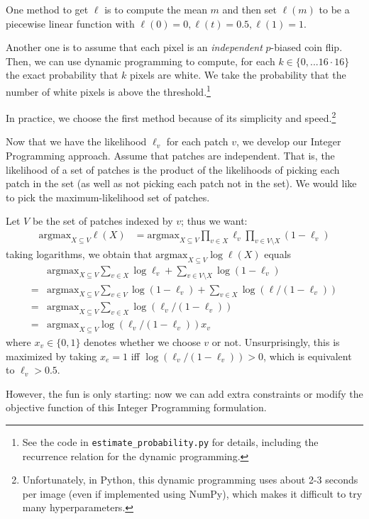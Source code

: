 \documentclass[10pt,conference,compsocconf]{IEEEtran}
\newcommand{\argmax}{\mathrm{argmax}}
\begin{document}
One method to get $\ell$ is to compute the mean $m$ and then set $\ell(m)$ to be a piecewise linear function with $\ell(0) = 0, \ell(t) = 0.5, \ell(1) = 1$.

Another one is to assume that each pixel is an \emph{independent} $p$-biased coin flip. Then, we can use dynamic programming to compute, for each $k \in \{0, ... 16 \cdot 16\}$ the exact probability that $k$ pixels are white. We take the probability that the number of white pixels is above the threshold.\footnote{See the code in \texttt{estimate\_probability.py} for details, including the recurrence relation for the dynamic programming.}

In practice, we choose the first method because of its simplicity and speed.\footnote{Unfortunately, in Python, this dynamic programming uses about 2-3 seconds per image (even if implemented using NumPy), which makes it difficult to try many hyperparameters.}

Now that we have the likelihood $\ell_v$ for each patch $v$, we develop our Integer Programming approach. Assume that patches are independent. That is, the likelihood of a set of patches is the product of the likelihoods of picking each patch in the set (as well as not picking each patch not in the set). We would like to pick the maximum-likelihood set of patches.


Let $V$ be the set of patches indexed by $v$; thus we want:
\begin{align*}
\argmax_{X \subseteq V} \ell(X) &= \argmax_{X \subseteq V} \prod_{v \in X} \ell_v \prod_{v \in V \setminus X} (1 - \ell_v)
\end{align*}
taking logarithms, we obtain that $\argmax_{X \subseteq V} \log \ell(X) $ equals
\begin{align*}
& \argmax_{X \subseteq V} \sum_{v \in X} \log \ell_v + \sum_{v \in V \setminus X} \log (1 - \ell_v) \\
=& \argmax_{X \subseteq V} \sum_{v \in V} \log (1 - \ell_v) + \sum_{v \in X} \log (\ell / (1 - \ell_v)) \\
=& \argmax_{X \subseteq V} \sum_{v \in X} \log (\ell_v / (1 - \ell_v)) \\
=& \argmax_{X \subseteq V} \log (\ell_v / (1 - \ell_v)) x_v
\end{align*}
where $x_v \in \{0,1\}$ denotes whether we choose $v$ or not. Unsurprisingly, this is maximized by taking $x_e = 1$ iff $\log(\ell_v / (1 - \ell_v)) > 0$, which is equivalent to $\ell_v > 0.5$.

However, the fun is only starting: now we can add extra constraints or modify the objective function of this Integer Programming formulation.
\end{document}
